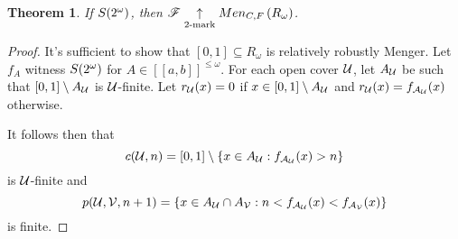 \documentclass{amsart}
\newtheorem{theorem}{Theorem}[section]
\theoremstyle{definition}
\begin{document}
\begin{theorem}
  If \(S(2^\omega)\), then \(\mathscr{F}\underset{2\text{-mark}}{\uparrow}Men_{C,F}\left({R_\omega}\right)\).
\end{theorem}

\begin{proof}
  It's sufficient to show that \([0,1]\subseteq R_\omega\) is relatively
  robustly Menger. Let \(f_A\) witness \(S(2^\omega)\)
  for \(A\in[[a,b]]^{\leq\omega}\).
  For each open cover \(\mathcal{U}\), let \(A_{\mathcal{U}}\) be
  such that \([0,1]\setminus A_{\mathcal{U}}\) is \(\mathcal{U}\)-finite.
  Let \(r_{\mathcal{U}}(x)=0\) if \(x\in[0,1]\setminus A_{\mathcal{U}}\) and
  \(r_{\mathcal{U}}(x)=f_{\mathcal{A}_{\mathcal{U}}}(x)\) otherwise.

  It follows then that
    \[
      c(\mathcal{U},n) = [0,1]\setminus\{x\in A_{\mathcal{U}}:f_{\mathcal{A}_{\mathcal{U}}}(x)>n\}
    \]
  is \(\mathcal{U}\)-finite and
    \[
      p(\mathcal{U},\mathcal{V},n+1)
        =
      \{x\in A_{\mathcal{U}}\cap A_{\mathcal{V}}
        :
      n<f_{\mathcal{A}_{\mathcal{U}}}(x)<f_{\mathcal{A}_{\mathcal{V}}}(x)\}
    \]
  is finite.
\end{proof}



\end{document}
